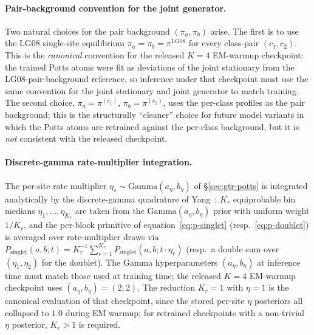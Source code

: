 \paragraph{Pair-background convention for the joint generator.}
Two natural choices for the pair background $(\pi_a, \pi_b)$
arise. The first is to use the LG08 single-site equilibrium
$\pi_a = \pi_b = \pi^{\mathrm{LG08}}$ for every class-pair
$(c_1, c_2)$. This is the \emph{canonical} convention for the
released $K{=}4$ EM-warmup checkpoint: the trained Potts atoms
were fit as deviations of the joint stationary from the
LG08-pair-background reference, so inference under that checkpoint
must use the same convention for the joint stationary and joint
generator to match training. The second choice,
$\pi_a = \pi^{(c_1)}$, $\pi_b = \pi^{(c_2)}$, uses the per-class
profiles as the pair background; this is the structurally
``cleaner'' choice for future model variants in which the Potts
atoms are retrained against the per-class background, but it is
\emph{not} consistent with the released checkpoint.

\paragraph{Discrete-gamma rate-multiplier integration.}
The per-site rate multiplier $\eta_s \sim \mathrm{Gamma}(a_\eta, b_\eta)$
of \S\ref{sec:gtr-potts} is integrated analytically by the discrete-gamma
quadrature of Yang~\citep{Yang1994a}: $K_r$ equiprobable bin
medians $\eta_1, \ldots, \eta_{K_r}$ are taken from the
$\mathrm{Gamma}(a_\eta, b_\eta)$ prior with uniform weight
$1 / K_r$, and the per-block primitive of
equation~\ref{eq:p-singlet} (resp.~\ref{eq:p-doublet}) is averaged
over rate-multiplier draws via
$P_{\mathrm{singlet}}(a, b; t) = K_r^{-1} \sum_{r = 1}^{K_r}
  P_{\mathrm{singlet}}(a, b; t \cdot \eta_r)$
(resp.\ a double sum over $(\eta_1, \eta_2)$ for the doublet).
The Gamma hyperparameters $(a_\eta, b_\eta)$ at inference time
must match those used at training time; the released
$K{=}4$ EM-warmup checkpoint uses
$(a_\eta, b_\eta) = (2, 2)$. The reduction $K_r = 1$ with
$\eta = 1$ is the canonical evaluation of that checkpoint, since
the stored per-site $\eta$ posteriors all collapsed to $1.0$
during EM warmup; for retrained checkpoints with a non-trivial
$\eta$ posterior, $K_r > 1$ is required.


